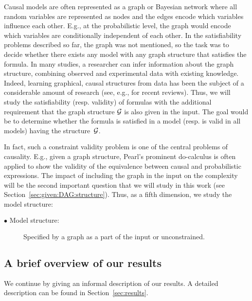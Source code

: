 \documentclass[a4paper,UKenglish,cleveref, autoref, thm-restate]{lipics-v2021}
\newcommand{\cG}{{\cal G}}
\begin{document}
Causal models are often represented as a graph or Bayesian network where all random variables are represented as nodes and the edges encode which variables influence each other. E.g., at the probabilistic level, the graph would encode which variables are conditionally independent of each other.
In the satisfiability problems described so far, the graph was not mentioned, so the task was to decide whether there exists any model with any graph structure that satisfies the formula. 
In many studies, a researcher can infer information about the graph structure, combining observed and experimental data with existing knowledge. 
Indeed, 
learning graphical, causal structures from data has been the subject of a considerable amount of research (see, e.g., \cite{meinshausen2016methods,drton2017structure,glymour2019review,squires2022causal} for recent reviews).
 Thus, we will study the satisfiability (resp. validity) of formulas with the additional requirement that the graph structure $\cG$ is also given in the input. 
The goal would be to determine whether the formula is satisfied in a model (resp. is valid in all models) 
having the structure~$\cG$.

In fact, such a constraint validity problem is one of the central problems of causality. E.g., given a graph structure, Pearl's  prominent do-calculus \cite{Pearl2009} is often applied to show the validity of the equivalence between causal and probabilistic expressions.
The  impact of including the graph in the input on the complexity will be the second important question that we will study in this work (see Section~\ref{sec:given:DAG:structure}). Thus, as a fifth dimension, we study the model structure:

\begin{description}
    \item[$\bullet$  Model structure:] Specified by a graph as a part of the input or unconstrained.
\end{description}

\subsection{A brief overview of our results}

We continue by giving an informal description of our results. A detailed description can be found in Section~\ref{sec:results}. 
\end{document}

